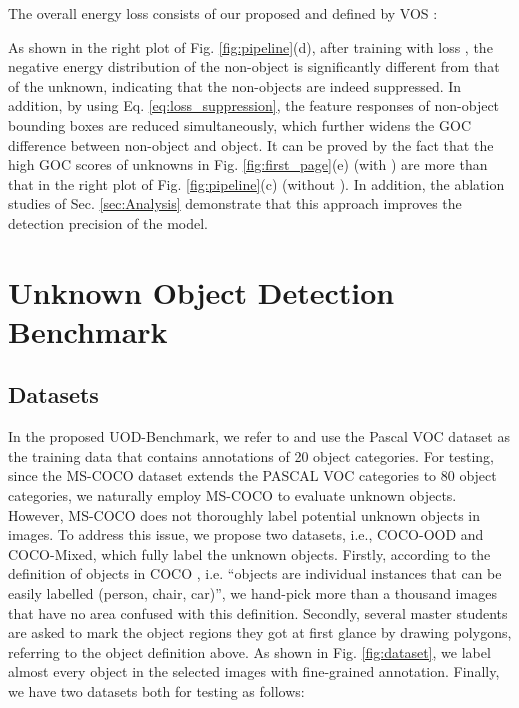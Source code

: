 \documentclass[10pt,twocolumn,letterpaper]{article}
\newcommand{\xf}[1]{{\color{black} #1}}
\begin{document}
The overall energy loss consists of our proposed  and  defined by VOS \cite{vos}:
\vspace{-5pt}


As shown in the right plot of Fig. \ref{fig:pipeline}(d),
after training with loss ,
the negative energy distribution of the non-object is significantly different from that of the unknown,
indicating that the non-objects are indeed suppressed.
In addition,
by using Eq. \ref{eq:loss_suppression},
the feature responses of non-object bounding boxes are reduced simultaneously,
which further widens the GOC difference between non-object and object.
It can be proved by the fact that the high GOC scores of unknowns in Fig. \ref{fig:first_page}(e) (with ) are more than that in the right plot of Fig. \ref{fig:pipeline}(c) (without ).
In addition,
the ablation studies of Sec. \ref{sec:Analysis} demonstrate that this approach improves the detection precision of the model.

\section{Unknown Object Detection Benchmark}
\label{sec:experimental}

\subsection{Datasets}
In the proposed UOD-Benchmark,
we refer to \cite{vos,owod} 
\xf{and use} the Pascal VOC dataset \cite{voc} as the training data that contains annotations of 20 object categories.
For testing,
since the MS-COCO dataset \cite{lin2014microsoft} extends the PASCAL VOC categories to 80 object categories,
we naturally employ MS-COCO \xf{to evaluate} unknown objects.
However, MS-COCO does not thoroughly label potential unknown objects in images.
To address this issue,
we propose two datasets, i.e., COCO-OOD and COCO-Mixed, which fully \xf{label} the unknown objects.
Firstly,
according to the definition of objects in COCO \cite{lin2014microsoft},
i.e. ``objects are individual instances that can be easily labelled (person, chair, car)'',
we hand-pick more than a thousand images that have no area confused with this definition.
Secondly,
several master students are asked to mark the object regions they got at first glance by drawing polygons,
referring to the object definition above.
As shown in Fig. \ref{fig:dataset},
we label almost every object in the selected images with fine-grained annotation.
Finally, we have two datasets both for testing as follows:
\end{document}
